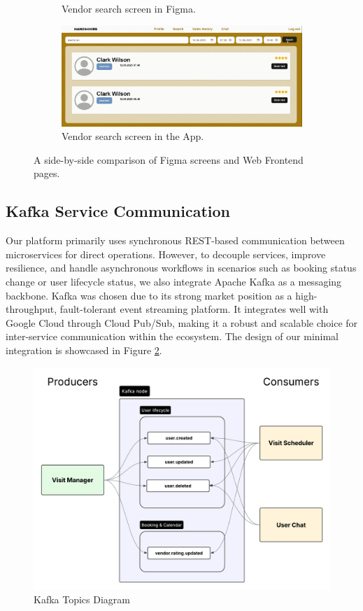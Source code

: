 \documentclass[11pt,a4paper]{article}
\begin{document}
\begin{figure}[!htb]
\begin{subfigure}[t]{0.49\textwidth}
\caption{Vendor search screen in Figma.}
\end{subfigure}%
\begin{subfigure}[t]{0.49\textwidth}
\centering
\includegraphics[width=\textwidth]{search_front}
\caption{Vendor search screen in the App.}
\end{subfigure}%

\caption[Frontend screens comparison.]{A side-by-side comparison of
Figma screens and Web Frontend pages.}
\label{fig:frontend_figma}
\end{figure}

\subsection{Kafka Service Communication}

Our platform primarily uses synchronous REST-based communication between microservices for direct operations. However, to decouple services, improve resilience, and handle asynchronous workflows in scenarios such as booking status change or user lifecycle status, we also integrate Apache Kafka as a messaging backbone.
Kafka was chosen due to its strong market position as a high-throughput, fault-tolerant event streaming platform. It integrates well with Google Cloud through Cloud Pub/Sub, making it a robust and scalable choice for inter-service communication within the ecosystem.
The design of our minimal integration is showcased in Figure \ref{fig:kafka-topics-diagram}.

\begin{figure}[H]
  \centering
  \includegraphics[width=\textwidth]{H4H_Kafka.png}
  \caption{Kafka Topics Diagram}
  \label{fig:kafka-topics-diagram}
\end{figure}
\end{document}
